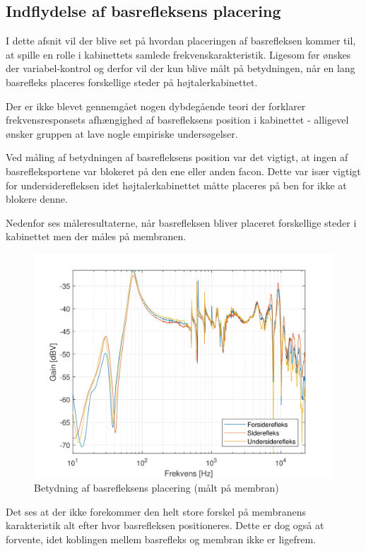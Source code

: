 \subsection{Indflydelse af basrefleksens placering}
I dette afsnit vil der blive set på hvordan placeringen af basrefleksen kommer til, at spille en rolle i kabinettets samlede frekvenskarakteristik. Ligesom før ønskes der variabel-kontrol og derfor vil der kun blive målt på betydningen, når en lang basrefleks placeres forskellige steder på højtalerkabinettet.

Der er ikke blevet gennemgået nogen dybdegående teori der forklarer frekvensresponsets afhængighed af basrefleksens position i kabinettet - alligevel ønsker gruppen at lave nogle empiriske undersøgelser.

Ved måling af betydningen af basrefleksens position var det vigtigt, at ingen af basrefleksportene var blokeret på den ene eller anden facon. Dette var især vigtigt for undersiderefleksen idet højtalerkabinettet måtte placeres på ben for ikke at blokere denne.

Nedenfor ses måleresultaterne, når basrefleksen bliver placeret forskellige steder i kabinettet men der måles på membranen.
\begin{figure}[H]
	\centering
	\vspace{-12pt}
	\includegraphics[width=\textwidth]{Billeder/Grafer/BasrefleksPlacementClose}
	\caption{Betydning af basrefleksens placering (målt på membran)}
\end{figure}

Det ses at der ikke forekommer den helt store forskel på membranens karakteristik alt efter hvor basrefleksen positioneres. Dette er dog også at forvente, idet koblingen mellem basrefleks og membran ikke er ligefrem.

